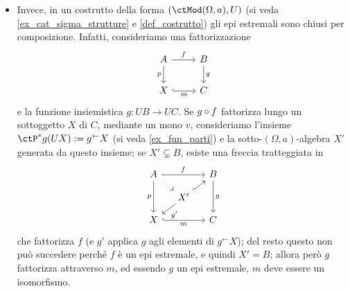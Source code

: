 \begin{remark}
\begin{itemize}
		\item Invece, in un costrutto della forma \((\ctMod(\Omega,a),U)\) (si veda \ref{ex_cat_sigma_strutture} e \ref{def_costrutto}) gli epi estremali sono chiusi per composizione. Infatti, consideriamo una fattorizzazione
		      \[\begin{tikzcd}
				      A & B \\
				      X & C
				      \arrow["f", from=1-1, to=1-2]
				      \arrow["p"', from=1-1, to=2-1]
				      \arrow["g", from=1-2, to=2-2]
				      \arrow["m"', hook, from=2-1, to=2-2]
			      \end{tikzcd}\]
		      e la funzione insiemistica \(g : UB\to UC\). Se \(g\circ f\) fattorizza lungo un sottoggetto \(X\) di \(C\), mediante un mono \(v\), consideriamo l'insieme \(\ctP^*g(UX) := g^\leftarrow X\) (si veda \ref{ex_fun_parti}) e la sotto-\((\Omega,a)\)-algebra \(X'\) generata da questo insieme; se \(X'\subsetneq B\), esiste una freccia tratteggiata in
		      \[\begin{tikzcd}[sep=small]
				      A && B \\
				      & X' \\
				      X && C
				      \arrow["f", from=1-1, to=1-3]
				      \arrow[dotted, from=1-1, to=2-2]
				      \arrow["p"', from=1-1, to=3-1]
				      \arrow["g", from=1-3, to=3-3]
				      \arrow[hook, from=2-2, to=1-3]
				      \arrow["g'", from=2-2, to=3-1]
				      \arrow["m"', hook, from=3-1, to=3-3]
			      \end{tikzcd}\]
		      che fattorizza \(f\) (e \(g'\) applica \(g\) agli elementi di \(g^\leftarrow X\)); del resto questo non può succedere perché \(f\) è un epi estremale, e quindi \(X' = B\); allora però \(g\) fattorizza attraverso \(m\), ed essendo \(g\) un epi estremale, \(m\) deve essere un isomorfismo.
	\end{itemize}
\end{remark}
